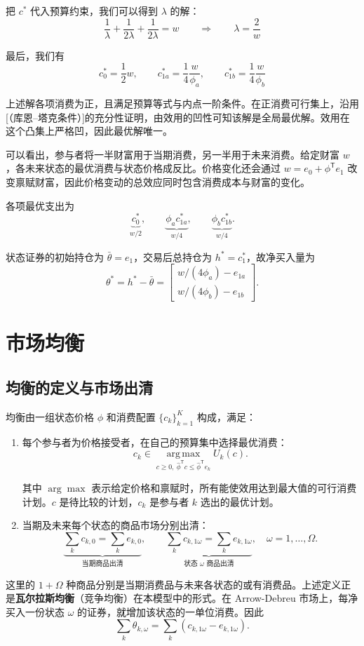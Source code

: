 \begin{tcolorbox}[example]
\begin{solution}[blank-type=manual,blank-vsep=5\baselineskip]
把 $c^{*}$ 代入预算约束，我们可以得到 $\lambda$ 的解：
\[
    \frac{1}{\lambda}+\frac{1}{2\lambda}+\frac{1}{2\lambda}=w\qquad\Rightarrow\qquad\lambda=\frac{2}{w}
\]

最后，我们有
\[
    c_{0}^{*}=\frac12 w,\qquad
    c_{1a}^{*}=\frac14\frac{w}{\phi_{a}},\qquad
    c_{1b}^{*}=\frac14\frac{w}{\phi_{b}}
\]

上述解各项消费为正，且满足预算等式与内点一阶条件。在正消费可行集上，沿用[（库恩--塔克条件）]的充分性证明，由效用的凹性可知该解是全局最优解。效用在这个凸集上严格凹，因此最优解唯一。

可以看出，参与者将一半财富用于当期消费，另一半用于未来消费。给定财富 $w$，各未来状态的最优消费与状态价格成反比。价格变化还会通过 $w=e_0+\phi^{\mathsf T}e_1$ 改变禀赋财富，因此价格变动的总效应同时包含消费成本与财富的变化。

各项最优支出为
\[
 \underbrace{c_0^*}_{w/2},\qquad
 \underbrace{\phi_a c_{1a}^*}_{w/4},\qquad
 \underbrace{\phi_b c_{1b}^*}_{w/4}.
\]

状态证券的初始持仓为 $\bar\theta=e_1$，交易后总持仓为 $h^*=c_1^*$，故净买入量为
\[
 \theta^*=h^*-\bar\theta
 =\begin{bmatrix}w/(4\phi_a)-e_{1a}\\w/(4\phi_b)-e_{1b}\end{bmatrix}.
\]

\end{solution}
\end{tcolorbox}


\section{市场均衡}
\subsection{均衡的定义与市场出清}
\label{sec:wj-three-equilibrium}
\begin{tcolorbox}[knowledge,title=Arrow-Debreu 均衡]
均衡由一组状态价格 $\phi$ 和消费配置 $\{c_k\}_{k=1}^K$ 构成，满足：
\begin{enumerate}
 \item 每个参与者为价格接受者，在自己的预算集中选择最优消费：
 \[
 c_k\in\operatorname*{arg\,max}_{c\ge0,\ \hat\phi^{\mathsf T}c\le\hat\phi^{\mathsf T}e_k}U_k(c).
 \]

 其中 $\arg\max$ 表示给定价格和禀赋时，所有能使效用达到最大值的可行消费计划。$c$ 是待比较的计划，$c_k$ 是参与者 $k$ 选出的最优计划。
 \item 当期及未来每个状态的商品市场分别出清：
 \[
 \underbrace{\sum_k c_{k,0}=\sum_k e_{k,0}}_{\text{当期商品出清}},\qquad
 \underbrace{\sum_k c_{k,1\omega}=\sum_k e_{k,1\omega}}_{\text{状态 }\omega\text{ 商品出清}},
 \quad\omega=1,\ldots,\Omega.
 \]
\end{enumerate}
\end{tcolorbox}
这里的 $1+\Omega$ 种商品分别是当期消费品与未来各状态的或有消费品。上述定义正是\textbf{瓦尔拉斯均衡}（竞争均衡）在本模型中的形式。在 Arrow-Debreu 市场上，每净买入一份状态 $\omega$ 的证券，就增加该状态的一单位消费。因此
\[
 \sum_k\theta_{k,\omega}
 =\sum_k(c_{k,1\omega}-e_{k,1\omega}).
\]


